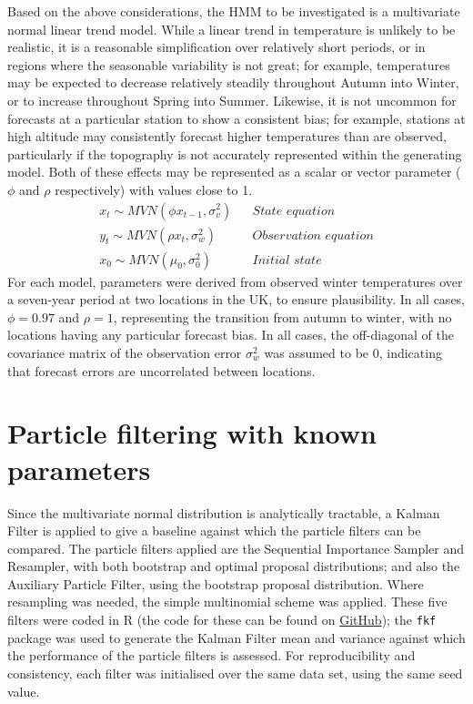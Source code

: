\documentclass[10pt,fleqn]{article}
\begin{document}
Based on the above considerations, the HMM to be investigated is a multivariate normal linear trend model. While a linear trend in temperature is unlikely to be realistic, it is a reasonable simplification over relatively short periods, or in regions where the seasonable variability is not great; for example, temperatures may be expected to decrease relatively steadily throughout Autumn into Winter, or to increase throughout Spring into Summer. Likewise, it is not uncommon for forecasts at a particular station to show a consistent bias; for example, stations at high altitude may consistently forecast higher temperatures than are observed, particularly if the topography is not accurately represented within the generating model. Both of these effects may be represented as a scalar or vector parameter ($\phi$ and $\rho$ respectively) with values close to 1. 
%
\begin{align*}
x_t \sim MVN(\phi x_{t-1}, \sigma_v^2)  && \textit{State equation} \\
y_t \sim MVN(\rho x_t, \sigma_w^2) && \textit{Observation equation} \\
x_0 \sim MVN(\mu_0, \sigma_0^2) && \textit{Initial state}
\end{align*}
%
For each model, parameters were derived from observed winter temperatures over a seven-year period at two locations in the UK, to ensure plausibility. In all cases, $\phi = 0.97$ and $\rho = 1$, representing the transition from autumn to winter, with no locations having any particular forecast bias. In all cases, the off-diagonal of the covariance matrix of the observation error $\sigma_w^2$ was assumed to be 0, indicating that forecast errors are uncorrelated between locations.

\section{Particle filtering with known parameters}

Since the multivariate normal distribution is analytically tractable, a Kalman Filter is applied to give a baseline against which the particle filters can be compared. The particle filters applied are the Sequential Importance Sampler and Resampler, with both bootstrap and optimal proposal distributions; and also the Auxiliary Particle Filter, using the bootstrap proposal distribution. Where resampling was needed, the simple multinomial scheme was applied. These five filters were coded in R (the code for these can be found on  \href{https://github.com/ClairBee/particle-filters/PF.R}{GitHub}); the \texttt{fkf} package was used to generate the Kalman Filter mean and variance against which the performance of the particle filters is assessed. For reproducibility and consistency, each filter was initialised over the same data set, using the same seed value.
\end{document}
